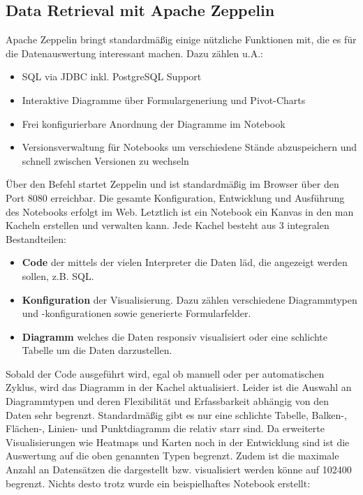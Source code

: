 \subsection{Data Retrieval mit Apache Zeppelin}
Apache Zeppelin bringt standardmäßig einige nützliche Funktionen mit, die es für die Datenauswertung interessant machen. Dazu zählen u.A.:
\begin{itemize}
	\item SQL via JDBC inkl. PostgreSQL Support
	\item Interaktive Diagramme über Formulargeneriung und Pivot-Charts
	\item Frei konfigurierbare Anordnung der Diagramme im Notebook
	\item Versionsverwaltung für Notebooks um verschiedene Stände abzuspeichern und schnell zwischen Versionen zu wechseln
\end{itemize}

Über den Befehl  startet Zeppelin und ist standardmäßig im Browser über den Port 8080 erreichbar. Die gesamte Konfiguration, Entwicklung und Ausführung des Notebooks erfolgt im Web. Letztlich ist ein Notebook ein Kanvas in den man Kacheln erstellen und verwalten kann. Jede Kachel besteht aus 3 integralen Bestandteilen:
\begin{itemize}
	\item \textbf{Code} der mittels der vielen Interpreter die Daten läd, die angezeigt werden sollen, z.B. SQL.
	\item \textbf{Konfiguration} der Visualisierung. Dazu zählen verschiedene Diagrammtypen und -konfigurationen sowie generierte Formularfelder. 
	\item \textbf{Diagramm} welches die Daten responsiv visualisiert oder eine schlichte Tabelle um die Daten darzustellen.
\end{itemize}

Sobald der Code ausgeführt wird, egal ob manuell oder per automatischen Zyklus, wird das Diagramm in der Kachel aktualisiert.\linebreak
Leider ist die Auswahl an Diagrammtypen und deren Flexibilität und Erfassbarkeit abhängig von den Daten sehr begrenzt. Standardmäßig gibt es nur eine schlichte Tabelle, Balken-, Flächen-, Linien- und Punktdiagramm die relativ starr sind. Da erweiterte Visualisierungen wie Heatmaps und Karten noch in der Entwicklung sind ist die Auswertung auf die oben genannten Typen begrenzt. Zudem ist die maximale Anzahl an Datensätzen die dargestellt bzw. visualisiert werden könne auf 102400 begrenzt. Nichts desto trotz wurde ein beispielhaftes Notebook erstellt:

